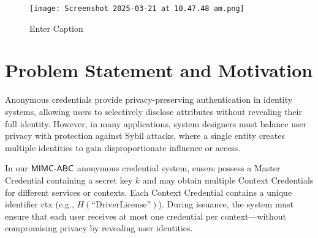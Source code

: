 \begin{figure}
    \centering
    \texttt{[image: Screenshot 2025-03-21 at 10.47.48 am.png]}
    \caption{Enter Caption}
\end{figure}
\clearpage



















































\section{Problem Statement and Motivation}

Anonymous credentials provide privacy-preserving authentication in identity systems, allowing users to selectively disclose attributes without revealing their full identity. However, in many applications, system designers must balance user privacy with protection against Sybil attacks, where a single entity creates multiple identities to gain disproportionate influence or access.

In our $\mathsf{MIMC\text{-}ABC}$ anonymous credential system, eusers possess a Master Credential containing a secret key $k$ and may obtain multiple Context Credentials for different services or contexts. Each Context Credential contains a unique identifier $\text{ctx}$ (e.g., $H(\text{``DriverLicense''})$). During issuance, the system must ensure that each user receives at most one credential per context—without compromising privacy by revealing user identities.


